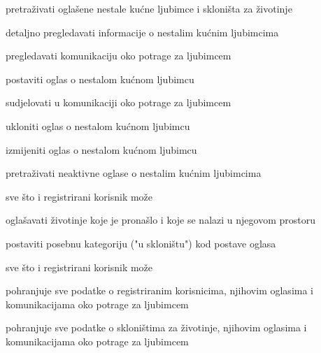 			
			\begin{packed_enum}
				\item  {}
				
				\begin{packed_enum}
					
					\item pretraživati oglašene nestale kućne ljubimce i skloništa za životinje
					\item detaljno pregledavati informacije o nestalim kućnim ljubimcima
					\item  pregledavati komunikaciju oko potrage za ljubimcem
					
				\end{packed_enum}

                \item  {}
				
				\begin{packed_enum}
					
					\item postaviti oglas o nestalom kućnom ljubimcu
					\item sudjelovati u komunikaciji oko potrage za ljubimcem
					\item ukloniti oglas o nestalom kućnom ljubimcu
					\item izmijeniti oglas o nestalom kućnom ljubimcu
					\item pretraživati neaktivne oglase o nestalim kućnim ljubimcima
					\item sve što i registrirani korisnik može
					
				\end{packed_enum}

                \item  {}
				
				\begin{packed_enum}
					
					\item oglašavati životinje koje je pronašlo i koje se nalazi u njegovom prostoru
					\item postaviti posebnu kategoriju ("u skloništu") kod postave oglasa
					\item sve što i registrirani korisnik može
					
				\end{packed_enum}
			
				\item  {}
				
				\begin{packed_enum}
					
					\item pohranjuje sve podatke o registriranim korisnicima, njihovim oglasima i komunikacijama oko potrage za ljubimcem
					\item pohranjuje sve podatke o skloništima za životinje, njihovim oglasima i komunikacijama oko potrage za ljubimcem
					
				\end{packed_enum}
			\end{packed_enum}
			
